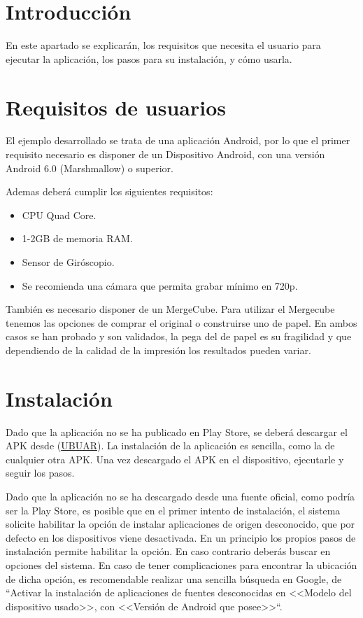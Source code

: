 
\section{Introducción}
 En este apartado se explicarán, los requisitos que necesita el usuario para ejecutar la aplicación, los pasos para su instalación, y cómo usarla.
  
\section{Requisitos de usuarios}
 El ejemplo desarrollado se trata de una aplicación Android, por lo que el primer requisito necesario es disponer de un Dispositivo Android, con una versión Android 6.0 (Marshmallow) o superior.
  
 Ademas deberá cumplir los siguientes requisitos\cite{vuforia_devices}:
 \begin{itemize}
 	\item CPU Quad Core.
 	\item 1-2GB de memoria RAM.
 	\item Sensor de Giróscopio.
 	\item Se recomienda una cámara que permita grabar mínimo en 720p.  
 \end{itemize}
También es necesario disponer de un MergeCube. Para utilizar el Mergecube tenemos las opciones de comprar el original o construirse uno de papel. En ambos casos se han probado y son validados, la pega del de papel es su fragilidad y que dependiendo de la calidad de la impresión los resultados pueden variar.

\section{Instalación}

Dado que la aplicación no se ha publicado en Play Store, se deberá descargar el APK desde (\href{https://github.com/smi0010/TFG_Herramientas_Realidad_Aumentada/releases/tag/UBU_AR}{UBUAR}).
La instalación de la aplicación es sencilla, como la de cualquier otra APK. Una vez descargado el APK en el dispositivo, ejecutarle y seguir los pasos. 

Dado que la aplicación no se ha descargado desde una fuente oficial, como podría ser la Play Store, es posible que en el primer intento de instalación, el sistema solicite habilitar la opción de instalar aplicaciones de origen desconocido, que por defecto en los dispositivos viene desactivada.
En un principio los propios pasos de instalación permite habilitar la opción. En caso contrario deberás buscar en opciones del sistema. En caso de tener complicaciones para encontrar la ubicación de dicha opción, es recomendable realizar una sencilla búsqueda en Google, de ``Activar la instalación de aplicaciones de fuentes desconocidas en <<Modelo del dispositivo usado>>, con <<Versión de Android que posee>>``.


